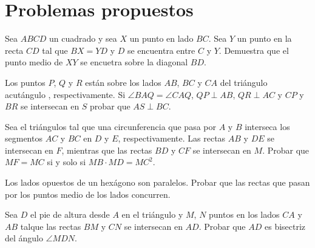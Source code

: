 \section{Problemas propuestos}

\begin{section-problem}
    Sea $ABCD$ un cuadrado y sea $X$ un punto en lado $BC$.
    Sea $Y$ un punto en la recta $CD$ tal que $BX = YD$ y $D$ se encuentra entre $C$ y $Y$.
    Demuestra que el punto medio de $XY$ se encuetra sobre la diagonal $BD$.
\end{section-problem}

\begin{section-problem}
    Los puntos $P$, $Q$ y $R$ están sobre los lados $AB$, $BC$ y $CA$ del triángulo acutángulo , respectivamente.
    Si $\angle BAQ = \angle CAQ$, $QP \perp AB$, $QR \perp AC$ y $CP$ y $BR$ se intersecan en $S$ probar que $AS \perp BC$.
\end{section-problem}

\begin{section-problem}
    Sea el triángulos  tal que una circunferencia que pasa por $A$ y $B$ interseca los segmentos $AC$ y $BC$ en $D$ y $E$, respectivamente.
    Las rectas $AB$ y $DE$ se intersecan en $F$, mientras que las rectas $BD$ y $CF$ se intersecan en $M$.
    Probar que $MF = MC$ si y solo si $MB \cdot MD = MC^2$.
\end{section-problem}

\begin{section-problem}
    Los lados opuestos de un hexágono son paralelos.
    Probar que las rectas que pasan por los puntos medio de los lados concurren.
\end{section-problem}

\begin{section-problem}
    Sea $D$ el pie de altura desde $A$ en el triángulo  y $M$, $N$ puntos en los lados $CA$ y $AB$ talque las rectas $BM$ y $CN$ se intersecan en $AD$.
    Probar que $AD$ es bisectriz del ángulo $\angle MDN$.
\end{section-problem}